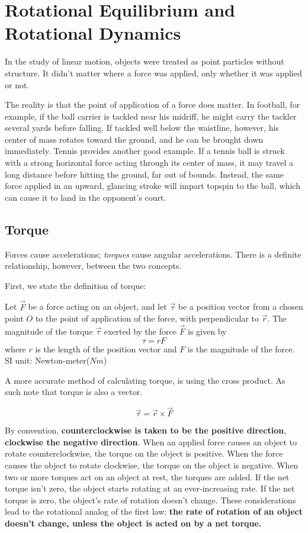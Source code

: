 \section{Rotational Equilibrium and Rotational Dynamics}

In the study of linear motion, objects were treated as point particles without structure. It didn't matter where a force was applied, only whether it was applied or not.

The reality is that the point of application of a force does matter. In football, for example, if the ball carrier is tackled near his midriff, he might carry the tackler several yards before falling. If tackled well below the waistline, however, his center of mass rotates toward the ground, and he can be brought down immediately. Tennis provides another good example. If a tennis ball is struck with a strong horizontal force acting through its center of mass, it may travel a long distance before hitting the ground, far out of bounds. Instead, the same force applied in an upward, glancing stroke will impart topspin to the ball, which can cause it to land in the opponent's court.

\subsection{Torque}
Forces cause accelerations; \textit{torques} cause angular accelerations. There is a definite relationship, however, between the two concepts.

First, we state the definition of torque:

\begin{defi}[Torque]
Let $\vec{F}$ be a force acting on an object, and let $\vec{\tau}$ be a position vector from a chosen point $O$ to the point of application of the force, with perpendicular to $\vec{r}$. The magnitude of the torque $\vec{\tau}$ exerted by the force $\vec{F}$ is given by
$$\tau = rF$$
where $r$ is the length of the position vector and $F$ is the magnitude of the force.
SI unit: Newton-meter($N m$)
\end{defi}

A more accurate method of calculating torque, is using the cross product. As such note that torque is also a vector.

\begin{form}
$$\vec{\tau} = \vec{r} \times \vec{F}$$
\end{form}

By convention, \textbf{counterclockwise is taken to be the positive direction}, \textbf{clockwise the negative direction}. When an applied force causes an object to rotate counterclockwise, the torque on the object is positive. When the force causes the object to rotate clockwise, the torque on the object is negative. When two or more torques act on an object at rest, the torques are added. If the net torque isn't zero, the object starts rotating at an ever-increasing rate. If the net torque is zero, the object's rate of rotation doesn't change. These considerations lead to the rotational analog of the first law: \textbf{the rate of rotation of an object doesn't change, unless the object is acted on by a net torque.}

